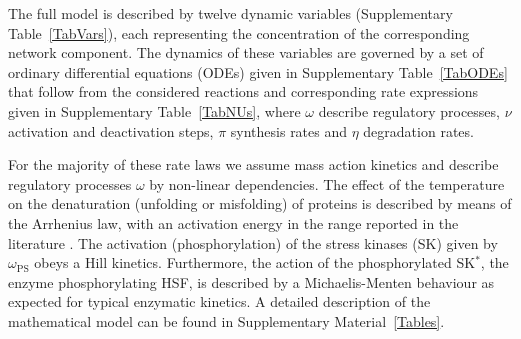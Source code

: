 \documentclass[oneside, 10pt, a4paper, twocolumn]{article}
\begin{document}
The full model is described by twelve dynamic variables (Supplementary Table~\ref{TabVars}), 
each representing the concentration of the corresponding network component. 
The dynamics of these variables are governed by a set of ordinary differential equations (ODEs) given in Supplementary Table~\ref{TabODEs} that follow from the considered reactions and corresponding rate expressions given in Supplementary Table~\ref{TabNUs}, where $\omega$ describe regulatory processes,  $\nu$ activation and deactivation steps,  $\pi$ synthesis rates and
 $\eta$ degradation rates.
  
For the majority of these rate laws we assume mass action kinetics and describe regulatory processes $\omega$ by  non-linear dependencies. The effect of the temperature on the denaturation (unfolding or misfolding) of proteins is described by means of the Arrhenius law, with an activation energy 
in the range reported in the literature \cite{Bischof2006,He2003}. The activation (phosphorylation) of the stress kinases (SK) given by $\omega_\textrm{PS}$ obeys a Hill kinetics. Furthermore, the action of the phosphorylated SK$^*$, the enzyme phosphorylating HSF, is described by a Michaelis-Menten behaviour as expected for typical enzymatic kinetics. A detailed description of the mathematical model can be found in Supplementary Material~\ref{Tables}.
\end{document}
